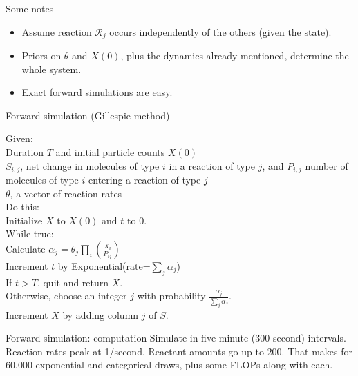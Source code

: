 \documentclass[12pt,a4paper,t,xcolor=dvipsnames,slidestop,compress,mathserif]{beamer}
\begin{document}
\begin{frame}{Some notes}

\begin{itemize}
\item Assume reaction $\mathcal{R}_j$ occurs independently of the others (given the state).\item Priors on $\theta$ and $X(0)$, plus the dynamics already mentioned, determine the whole system.
\item Exact forward simulations are easy.
\end{itemize}
\end{frame}

\begin{frame}{Forward simulation (Gillespie method)}


\begin{algorithm}[H]
Given:\\
\Indp
Duration $T$ and initial particle counts $X(0)$\\
$S_{i,j}$, net change in molecules of type $i$ in a reaction of type $j$, and $P_{i,j}$ number of molecules of type $i$ entering a reaction of type $j$\\
$\theta$, a vector of reaction rates\\
\Indm
Do this:\\
\Indp
Initialize $X$ to $X(0)$ and $t$ to 0.\\
While true:\\
\Indp
Calculate $\alpha_j = \theta_j\prod_i {X_i\choose P_{ij}}$\\
Increment $t$ by Exponential(rate=$\sum_j \alpha_j$) \\
If $t > T$, quit and return $X$.\\
Otherwise, choose an integer $j$ with probability $\frac{\alpha_j}{\sum_j \alpha_j}$.\\
Increment $X$ by adding column $j$ of $S$.\\
\end{algorithm}


\end{frame}
\begin{frame}{Forward simulation: computation}
Simulate in five minute (300-second) intervals. Reaction rates peak at 1/second. Reactant amounts go up to 200. That makes for 60,000 exponential and categorical draws, plus some FLOPs along with each.
\end{frame}
\end{document}

